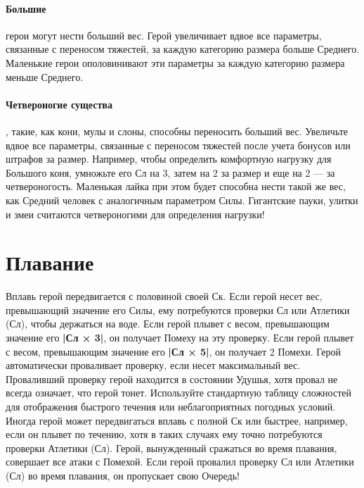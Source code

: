 \paragraph{Большие} герои могут нести больший вес. Герой увеличивает вдвое все параметры, связанные с переносом тяжестей, за каждую категорию размера больше Среднего. Маленькие герои ополовинивают эти параметры за каждую категорию размера меньше Среднего.
\paragraph{Четвероногие существа}, такие, как кони, мулы и слоны, способны переносить больший вес. Увеличьте вдвое все параметры, связанные с переносом тяжестей после учета бонусов или штрафов за размер. Например, чтобы определить комфортную нагрузку для Большого коня, умножьте его Сл на 3, затем на 2 за размер и еще на 2 — за четвероногость. Маленькая лайка при этом будет способна нести такой же вес, как Средний человек с аналогичным параметром Силы. Гигантские пауки, улитки и змеи считаются четвероногими для определения нагрузки!
\section{Плавание}
Вплавь герой передвигается с половиной своей Ск. Если герой несет вес, превышающий значение его Силы, ему потребуются проверки Сл или Атлетики (Сл), чтобы держаться на воде. Если герой плывет с весом, превышающим значение его \textbf{|Сл × 3|}, он получает Помеху на эту проверку. Если герой плывет с весом, превышающим значение его \textbf{|Сл × 5|}, он получает 2 Помехи. Герой автоматически проваливает проверку, если несет максимальный вес. Проваливший проверку герой находится в состоянии Удушья, хотя провал не всегда означает, что герой тонет. Используйте стандартную таблицу сложностей для отображения быстрого течения или неблагоприятных погодных условий. Иногда герой может передвигаться вплавь с полной Ск или быстрее, например, если он плывет по течению, хотя в таких случаях ему точно потребуются проверки Атлетики (Сл).
\newline
Герой, вынужденный сражаться во время плавания, совершает все атаки с Помехой. Если герой провалил проверку Сл или Атлетики (Сл) во время плавания, он пропускает свою Очередь!
